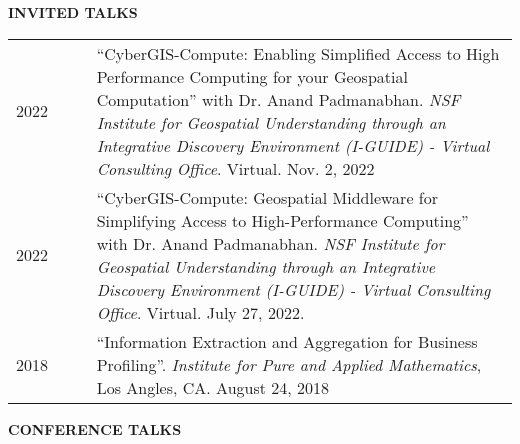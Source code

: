 \documentclass{acmcv}
\begin{document}

    \textbf{\uppercase{Invited Talks}}

    \begin{longtable}{p{0.16\linewidth} p{0.84\linewidth}}
        2022 & ``CyberGIS-Compute: Enabling Simplified Access to High Performance Computing for your Geospatial Computation'' with Dr. Anand Padmanabhan. \textit{NSF Institute for Geospatial Understanding through an Integrative Discovery Environment (I-GUIDE) - Virtual Consulting Office}. Virtual. Nov. 2, 2022\\

        2022 & ``CyberGIS-Compute: Geospatial Middleware for Simplifying Access to High-Performance Computing'' with Dr. Anand Padmanabhan. \textit{NSF Institute for Geospatial Understanding through an Integrative Discovery Environment (I-GUIDE) - Virtual Consulting Office}. Virtual. July 27, 2022. \\

        2018 & ``Information Extraction and Aggregation for Business Profiling''. \textit{Institute for Pure and Applied Mathematics}, Los Angles, CA. August 24, 2018 \\

    \end{longtable}

	\textbf{\uppercase{Conference Talks}}
\end{document}
